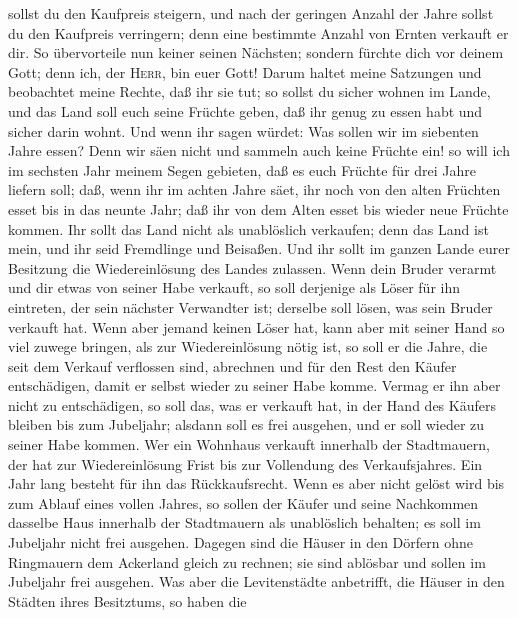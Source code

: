sollst du den Kaufpreis steigern, und nach der geringen Anzahl der Jahre
sollst du den Kaufpreis verringern; denn eine bestimmte Anzahl von
Ernten verkauft er dir.  So übervorteile nun keiner
seinen Nächsten; sondern fürchte dich vor deinem Gott; denn ich, der
\textsc{Herr}, bin euer Gott!  Darum haltet meine
Satzungen und beobachtet meine Rechte, daß ihr sie tut; so sollst du
sicher wohnen im Lande,  und das Land soll euch seine
Früchte geben, daß ihr genug zu essen habt und sicher darin wohnt.
 Und wenn ihr sagen würdet: Was sollen wir im siebenten
Jahre essen? Denn wir säen nicht und sammeln auch keine Früchte ein!
 so will ich im sechsten Jahr meinem Segen gebieten, daß
es euch Früchte für drei Jahre liefern soll;  daß, wenn
ihr im achten Jahre säet, ihr noch von den alten Früchten esset bis in
das neunte Jahr; daß ihr von dem Alten esset bis wieder neue Früchte
kommen.  Ihr sollt das Land nicht als unablöslich
verkaufen; denn das Land ist mein, und ihr seid Fremdlinge und Beisaßen.
 Und ihr sollt im ganzen Lande eurer Besitzung die
Wiedereinlösung des Landes zulassen.  Wenn dein Bruder
verarmt und dir etwas von seiner Habe verkauft, so soll derjenige als
Löser für ihn eintreten, der sein nächster Verwandter ist; derselbe soll
lösen, was sein Bruder verkauft hat.  Wenn aber jemand
keinen Löser hat, kann aber mit seiner Hand so viel zuwege bringen, als
zur Wiedereinlösung nötig ist,  so soll er die Jahre, die
seit dem Verkauf verflossen sind, abrechnen und für den Rest den Käufer
entschädigen, damit er selbst wieder zu seiner Habe komme.
 Vermag er ihn aber nicht zu entschädigen, so soll das,
was er verkauft hat, in der Hand des Käufers bleiben bis zum Jubeljahr;
alsdann soll es frei ausgehen, und er soll wieder zu seiner Habe kommen.
 Wer ein Wohnhaus verkauft innerhalb der Stadtmauern, der
hat zur Wiedereinlösung Frist bis zur Vollendung des Verkaufsjahres. Ein
Jahr lang besteht für ihn das Rückkaufsrecht.  Wenn es
aber nicht gelöst wird bis zum Ablauf eines vollen Jahres, so sollen der
Käufer und seine Nachkommen dasselbe Haus innerhalb der Stadtmauern als
unablöslich behalten; es soll im Jubeljahr nicht frei ausgehen.
 Dagegen sind die Häuser in den Dörfern ohne Ringmauern
dem Ackerland gleich zu rechnen; sie sind ablösbar und sollen im
Jubeljahr frei ausgehen.  Was aber die Levitenstädte
anbetrifft, die Häuser in den Städten ihres Besitztums, so haben die
